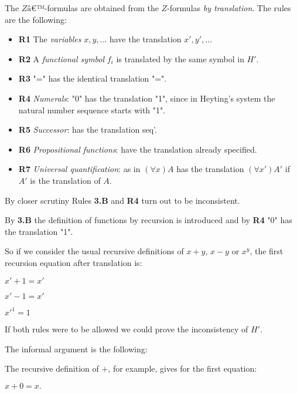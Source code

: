\documentclass[12pt]{article}
\begin{document}
\begin{enumerate}
The $Zâ€™$-formulas are obtained from the $Z$-formulas \emph{by translation}. The rules are the following:

\begin{itemize}
\item \textbf{R1} The \emph{variables} $x, y, \ldots$ have the translation $x', y', \ldots$

\item \textbf{R2} A \emph{functional symbol} $f_i$ is translated by the same symbol in $H'$.

\item \textbf{R3} "=" has the identical translation "=".

\item \textbf{R4} \emph{Numerals}: "0" has the translation "1", since in Heyting's system the natural number sequence starts with "1".

\item \textbf{R5} \emph{Successor}: has the translation seq'.

\item \textbf{R6} \emph{Propositional functions}: have the translation already specified.

\item \textbf{R7} \emph{Universal quantification}: as in $(\forall x) A$ has the translation $(\forall x') A'$ if $A'$ is the translation of $A$.
\end{itemize}

By closer scrutiny Rules \textbf{3.B} and \textbf{R4} turn out to be inconsistent.

By \textbf{3.B} the definition of functions by recursion is introduced and by \textbf{R4} "0" has the translation "1".

So if we consider the usual recursive definitions of $x + y$, $x - y$ or $x^y$, the first recursion equation after translation is:

\begin{center}
$x' + 1 = x'$

$x' - 1 = x'$

$x'^1 = 1$
\end{center}

If both rules were to be allowed we could prove the inconsistency of $H'$.
 
The informal argument is the following:

The recursive definition of $+$, for example, gives for the first equation:

\begin{center}  
$x + 0 = x.$ 
\end{center}


\end{enumerate}
\end{document}
